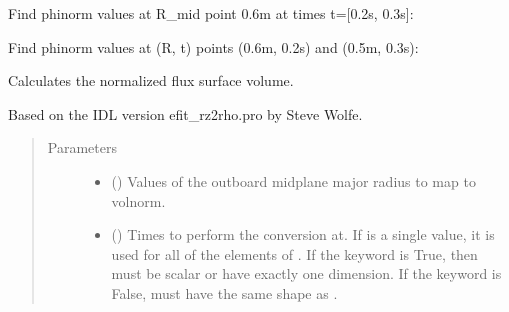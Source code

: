 \documentclass[letterpaper,10pt,english]{sphinxmanual}
\begin{document}
\begin{fulllineitems}
\begin{fulllineitems}
Find phinorm values at R\_mid point 0.6m at times t={[}0.2s, 0.3s{]}:

\begin{sphinxVerbatim}[commandchars=\\\{\}]
   \PYG{p}{[} \PYG{p}{]}
\end{sphinxVerbatim}

Find phinorm values at (R, t) points (0.6m, 0.2s) and (0.5m, 0.3s):

\begin{sphinxVerbatim}[commandchars=\\\{\}]
  \PYG{p}{[} \PYG{p}{]} \PYG{p}{[} \PYG{p}{]} 
\end{sphinxVerbatim}

\end{fulllineitems}


\begin{fulllineitems}
\label{\detokenize{eqtools:eqtools.core.Equilibrium.rmid2volnorm}}
Calculates the normalized flux surface volume.

Based on the IDL version efit\_rz2rho.pro by Steve Wolfe.
\begin{quote}\begin{description}
\item[{Parameters}] \leavevmode\begin{itemize}
\item {} 
 () \textendash{} Values of the outboard midplane
major radius to map to volnorm.

\item {} 
 () \textendash{} Times to perform the conversion at.
If  is a single value, it is used for all of the elements of
. If the  keyword is True, then  must be scalar
or have exactly one dimension. If the  keyword is False,
 must have the same shape as .


\end{itemize}
\end{description}
\end{quote}
\end{fulllineitems}
\end{fulllineitems}
\end{document}

